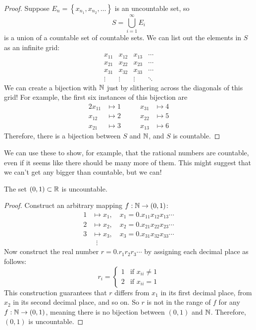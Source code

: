\documentclass[../m131main.tex]{subfiles}
\begin{document}
\begin{proof}
    Suppose $E_n = \left\{ x_{n_1}, x_{n_2}, \ldots \right\}$ is an uncountable set, so
    \[ S = \bigcup_{i=1}^\infty E_i \]
    is a union of a countable set of countable sets.
    We can list out the elements in $S$ as an infinite grid:
    \[ \begin{matrix}  
        x_{11} & x_{12} & x_{13} & \cdots \\
        x_{21} & x_{22} & x_{23} & \cdots \\
        x_{31} & x_{32} & x_{33} & \cdots \\
        \vdots & \vdots & \vdots & \ddots
    \end{matrix} \]
    We can create a bijection with $\mathbb{N}$ just by slithering across the diagonals of this grid!
    For example, the first six instances of this bijection are
    \begin{alignat*}{2}
        x_{11} &\mapsto 1 &\qquad x_{31} &\mapsto 4 \\
        x_{12} &\mapsto 2 &\qquad x_{22} &\mapsto 5 \\
        x_{21} &\mapsto 3 &\qquad x_{13} &\mapsto 6
    \end{alignat*}
    Therefore, there is a bijection between $S$ and $\mathbb{N}$, and $S$ is countable.
\end{proof}

We can use these to show, for example, that the rational numbers are countable, even if it seems like there should be many more of them.
This might suggest that we can't get any bigger than countable, but we can!

\begin{theorem}
    The set $(0,1) \subset \mathbb{R}$ is uncountable.
\end{theorem}

\begin{proof}
    Construct an arbitrary mapping $f : \mathbb{N} \to (0,1)$:
    \begin{align*}
        1 &\mapsto x_1, \quad x_1 = 0.x_{11}x_{12}x_{13} \cdots \\
        2 &\mapsto x_2, \quad x_2 = 0.x_{21}x_{22}x_{23} \cdots \\
        3 &\mapsto x_3, \quad x_3 = 0.x_{31}x_{32}x_{33} \cdots \\
        &\;\;\vdots
    \end{align*}
    Now construct the real number $r = 0.r_1r_2r_3 \cdots$ by assigning each decimal place as follows:
    \[ r_i = \begin{cases} 1 & \text{if } x_{ii} \neq 1 \\ 2 & \text{if } x_{ii} = 1 \end{cases} \]
    This construction guarantees that $r$ differs from $x_1$ in its first decimal place, from $x_2$ in its second decimal place, and so on.
    So $r$ is not in the range of $f$ for any $f : \mathbb{N} \to (0,1)$, meaning there is no bijection between $(0,1)$ and $\mathbb{N}$.
    Therefore, $(0,1)$ is uncountable.
\end{proof}
\end{document}
